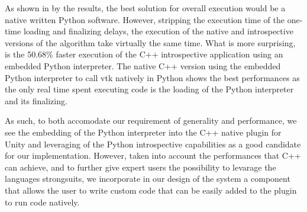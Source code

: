 As shown in by the results, the best solution for overall execution would be a native written Python software. However, stripping the execution time of the one-time loading and finalizing delays, the execution of the native and introspective versions of the algorithm take virtually the same time. What is more surprising, is the 50.68\% faster execution of the C++ introspective application using an embedded Python interpreter. The native C++ version using the embedded Python interpreter to call \acrshort{vtk} natively in Python shows the best performances as the only real time spent executing code is the loading of the Python interpreter and its finalizing.

As such, to both accomodate our requirement of generality and performance, we see the embedding of the Python interpreter into the C++ native plugin for Unity and leveraging of the Python introspective capabilities as a good candidate for our implementation. However, taken into account the performances that C++ can achieve, and to further give expert users the possibility to levarage the languages strongsuits, we incorporate in our design of the system a component that allows the user to write custom code that can be easily added to the plugin to run code natively.